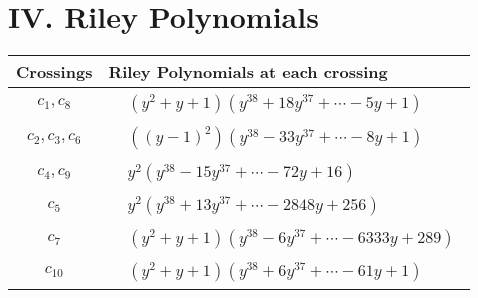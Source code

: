 \documentclass[1p]{elsarticle_modified}
\theoremstyle{definition}
\begin{document}
\centering \section*{ IV. Riley Polynomials}
\begin{tabular}{m{50pt}|m{274pt}}
Crossings & \hspace{64pt}Riley Polynomials at each crossing \\
\hline $$\begin{aligned}c_{1},c_{8}\end{aligned}$$&$\begin{aligned}
&(y^2+y+1)(y^{38}+18 y^{37}+\cdots-5 y+1)
\end{aligned}$\\
\hline $$\begin{aligned}c_{2},c_{3},c_{6}\end{aligned}$$&$\begin{aligned}
&((y-1)^2)(y^{38}-33 y^{37}+\cdots-8 y+1)
\end{aligned}$\\
\hline $$\begin{aligned}c_{4},c_{9}\end{aligned}$$&$\begin{aligned}
&y^2(y^{38}-15 y^{37}+\cdots-72 y+16)
\end{aligned}$\\
\hline $$\begin{aligned}c_{5}\end{aligned}$$&$\begin{aligned}
&y^2(y^{38}+13 y^{37}+\cdots-2848 y+256)
\end{aligned}$\\
\hline $$\begin{aligned}c_{7}\end{aligned}$$&$\begin{aligned}
&(y^2+y+1)(y^{38}-6 y^{37}+\cdots-6333 y+289)
\end{aligned}$\\
\hline $$\begin{aligned}c_{10}\end{aligned}$$&$\begin{aligned}
&(y^2+y+1)(y^{38}+6 y^{37}+\cdots-61 y+1)
\end{aligned}$\\
\hline
\end{tabular}
\vskip 2pc
\end{document}
